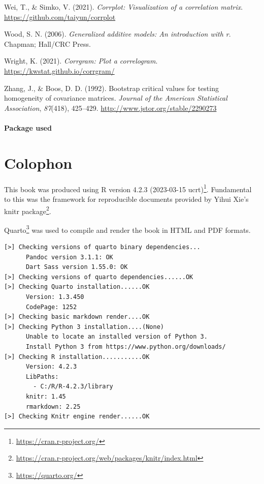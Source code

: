 \documentclass[
  letterpaper,
  10pt,
  krantz2]{krantz}
\newlength{\cslhangindent}
\newlength{\cslentryspacingunit} %
\newenvironment{CSLReferences}[2] %
 {%
  \setlength{\parindent}{0pt}
  \ifodd #1
  \let\oldpar\par
  \def\par{\hangindent=\cslhangindent\oldpar}
  \fi
  \setlength{\parskip}{#2\cslentryspacingunit}
 }%
 {}
\providecommand{\href}[2]{#2\footnote{\url{#1}}}
\begin{document}
\begin{CSLReferences}{1}{0}
\leavevmode{}%
Wei, T., \& Simko, V. (2021). \emph{Corrplot: Visualization of a
correlation matrix}. \url{https://github.com/taiyun/corrplot}

\leavevmode{}%
Wood, S. N. (2006). \emph{Generalized additive models: An introduction
with r}. Chapman; Hall/CRC Press.

\leavevmode{}%
Wright, K. (2021). \emph{Corrgram: Plot a correlogram}.
\url{https://kwstat.github.io/corrgram/}

\leavevmode{}%
Zhang, J., \& Boos, D. D. (1992). Bootstrap critical values for testing
homogeneity of covariance matrices. \emph{Journal of the American
Statistical Association}, \emph{87}(418), 425--429.
\url{http://www.jstor.org/stable/2290273}

\end{CSLReferences}

\hypertarget{package-used}{%
\subsubsection*{Package used}\label{package-used}}


\hypertarget{colophon}{%
\chapter*{Colophon}\label{colophon}}


This book was produced using \href{https://cran.r-project.org/}{R
version 4.2.3 (2023-03-15 ucrt)}. Fundamental to this was the framework
for reproducible documents provided by Yihui Xie's
\href{https://cran.r-project.org/web/packages/knitr/index.html}{knitr
package}.

\href{https://quarto.org/}{Quarto} was used to compile and render the
book in HTML and PDF formats.

\begin{verbatim}
[>] Checking versions of quarto binary dependencies...
      Pandoc version 3.1.1: OK
      Dart Sass version 1.55.0: OK
[>] Checking versions of quarto dependencies......OK
[>] Checking Quarto installation......OK
      Version: 1.3.450
      CodePage: 1252
[>] Checking basic markdown render....OK
[>] Checking Python 3 installation....(None)
      Unable to locate an installed version of Python 3.
      Install Python 3 from https://www.python.org/downloads/
[>] Checking R installation...........OK
      Version: 4.2.3
      LibPaths:
        - C:/R/R-4.2.3/library
      knitr: 1.45
      rmarkdown: 2.25
[>] Checking Knitr engine render......OK
\end{verbatim}
\end{document}
